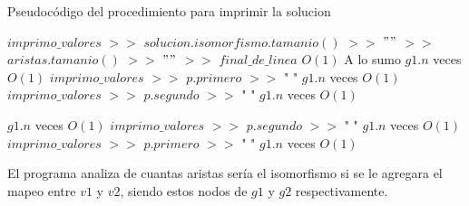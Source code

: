 %
\begin{algorithm}[H]
  \begin{algorithmic}[1]
  \caption{Pseudocódigo del procedimiento para imprimir la solucion}
  \label{algo:ap-3}
    \State $imprimo\_valores$ $>>$ $solucion.isomorfismo.tamanio()$ $>>$ $" "$ $>>$ $aristas.tamanio()$ $>>$ $" "$ $>>$ $final\_de\_linea$
    \Comment $O(1)$
        \Comment A lo sumo $g1.n$ veces $O(1)$
		    \State $imprimo\_valores$ $>>$ $p.primero$ $>>$ " "
        \Comment $g1.n$ veces $O(1)$
		 \Else
		    \State $imprimo\_valores$ $>>$ $p.segundo$ $>>$ " "
        \Comment $g1.n$ veces $O(1)$

		 \EndIf 
		
    \EndFor
        \Comment $g1.n$ veces $O(1)$
		    \State $imprimo\_valores$ $>>$ $p.segundo$ $>>$ " "
        \Comment $g1.n$ veces $O(1)$
		 \Else
		    \State $imprimo\_valores$ $>>$ $p.primero$ $>>$ " "
        \Comment $g1.n$ veces $O(1)$

		 \EndIf 
		
    \EndFor
		\EndProcedure
	\end{algorithmic}
\end{algorithm}

El programa analiza de cuantas aristas sería el isomorfismo si se le agregara el mapeo entre $v1$ y $v2$, siendo estos nodos de $g1$ y $g2$ respectivamente.

